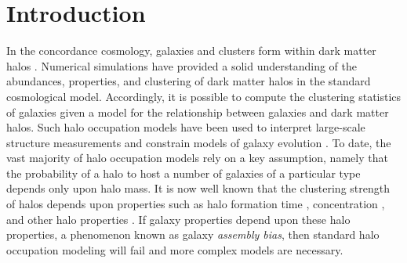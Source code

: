 \documentclass[usenatbib,fleqn]{mnras}
\begin{document}


\section{Introduction}
\label{section:introduction}

 In the concordance cosmology, galaxies and clusters form within dark matter halos \citep{white_rees78,blumenthal_etal84, mo_etal10}. Numerical simulations have provided a solid understanding of the abundances, properties, and 
	clustering of dark matter halos in the standard cosmological model. Accordingly, it is possible to compute the 
clustering statistics of galaxies given a model for the relationship between galaxies and dark matter halos. 
Such halo occupation models have been used to interpret large-scale structure measurements and 
constrain models of galaxy evolution \citep{yang_etal03,tinker_etal05,zehavi_etal05b,porciani_norberg06,vdbosch_etal07,zheng_etal07,conroy_wechsler09,
yang_etal09b,zehavi_etal11,guo_etal11a,wake_etal11,yang_etal11a,yang_etal12,leauthaud_etal12,
rodriguezpuebla_etal12, behroozi_etal13b, moster_etal13, tinker_etal13,cacciato_etal13,more_etal13,guo_etal14,
zu_mandelbaum15b}.
To date, the vast majority of halo occupation models rely on a key assumption, namely that 
the probability of a halo to host a number of galaxies of a particular type 
depends only upon halo mass. It is now well known that the clustering strength of halos depends upon 
properties such as halo formation time \citep{gao_etal05,harker_etal06, wechsler_etal06,gao_white07,croton_etal07,zentner07,dalal_etal08, li_etal08, lacerna_padilla11}, 
concentration \citep{wechsler_etal06,faltenbacher_white10, mao_etal15}, and other halo properties \citep{bett_etal07, hahn_etal07a, hahn_etal07b, faltenbacher_white10, vandaalen_etal12, fisher_faltenbacher16, sunayama_etal16, chavesmontero_etal16}. 
If galaxy properties depend upon these halo properties, a phenomenon known as galaxy {\em assembly bias}, 
then standard halo occupation modeling will fail \citep{zentner_etal14} 
and more complex models \citep{gilmarin_etal11, hearin_etal16} are necessary.
\end{document}
